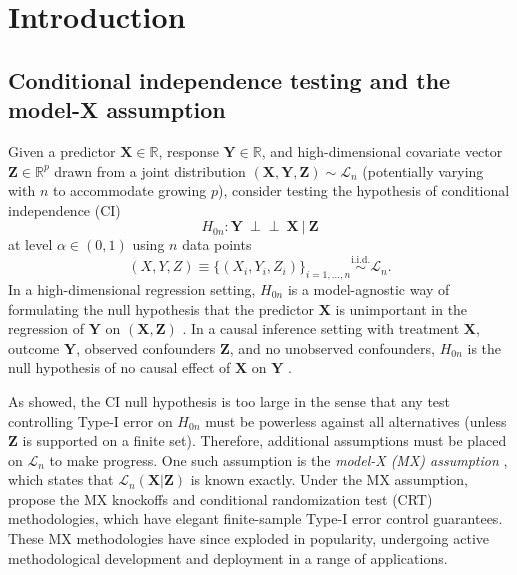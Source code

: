\documentclass[aos]{imsart}
\theoremstyle{plain}
\theoremstyle{remark}
\newcommand{\R}{\mathbb{R}}								%
\newcommand{\independent}{{\perp \! \! \! \perp}}		%
\newcommand{\iidsim}{\stackrel{\mathrm{i.i.d.}}{\sim}} 	%
\newcommand{\prx}{\bm X}								%
\newcommand{\srx}{X}									%
\newcommand{\prz}{\bm Z}								%
\newcommand{\srz}{Z}									%
\newcommand{\pry}{{\bm Y}}								%
\newcommand{\sry}{Y}									%
\newcommand{\law}{\mathcal L}							%
\begin{document}
\section{Introduction}
	
\subsection{Conditional independence testing and the model-X assumption} \label{sec:ci-testing-and-mx}

Given a predictor $\prx \in \R$, response $\pry \in \R$, and high-dimensional covariate vector $\prz \in \R^{p}$ drawn from a joint distribution $(\prx, \pry, \prz) \sim \law_n$ (potentially varying with $n$ to accommodate growing $p$), consider testing the hypothesis of conditional independence (CI)
\begin{equation}
    H_{0n}: \pry\ \independent\ \prx\ |\ \prz
    \label{conditional-independence}
\end{equation}
at level $\alpha \in (0,1)$ using $n$ data points
\begin{equation}
    \label{eq:xyz}
    (\srx, \sry, \srz) \equiv \{(\srx_i, \sry_i, \srz_i)\}_{i = 1, \dots, n} \iidsim \law_n. 
\end{equation}
In a high-dimensional regression setting, $H_{0n}$ is a model-agnostic way of formulating the null hypothesis that the predictor $\prx$ is unimportant in the regression of $\pry$ on $(\prx, \prz)$ \citep{CetL16}. In a causal inference setting with treatment $\prx$, outcome $\pry$, observed confounders $\prz$, and no unobserved confounders, $H_{0n}$ is the null hypothesis of no causal effect of $\prx$ on $\pry$ \citep{Pearl2009}.

As \citet{Shah2018} showed, the CI null hypothesis is too large in the sense that any test controlling Type-I error on $H_{0n}$ must be powerless against all alternatives (unless $\prz$ is supported on a finite set). Therefore, additional assumptions must be placed on $\law_n$ to make progress. One such assumption is the \textit{model-X (MX) assumption} \citep{CetL16}, which states that $\law_n(\prx | \prz)$ is known exactly. Under the MX assumption, \citet{CetL16} propose the MX knockoffs and conditional randomization test (CRT) methodologies, which have elegant finite-sample Type-I error control guarantees. These MX methodologies have since exploded in popularity, undergoing active methodological development and deployment in a range of applications.
\end{document}

